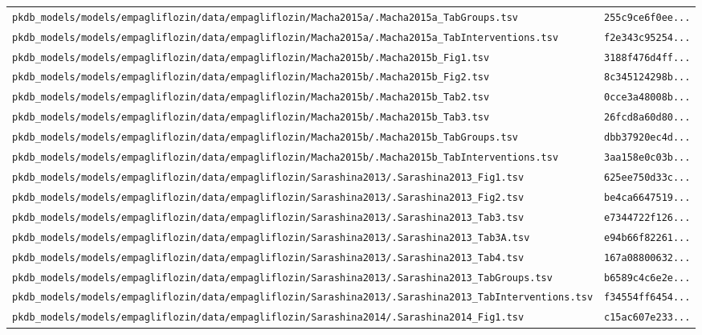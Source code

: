 \begin{longtable}{ll}
\texttt{pkdb\_models/models/empagliflozin/data/empagliflozin/Macha2015a/.Macha2015a\_TabGroups.tsv} & \texttt{255c9ce6f0ee...} \\
\texttt{pkdb\_models/models/empagliflozin/data/empagliflozin/Macha2015a/.Macha2015a\_TabInterventions.tsv} & \texttt{f2e343c95254...} \\
\texttt{pkdb\_models/models/empagliflozin/data/empagliflozin/Macha2015b/.Macha2015b\_Fig1.tsv} & \texttt{3188f476d4ff...} \\
\texttt{pkdb\_models/models/empagliflozin/data/empagliflozin/Macha2015b/.Macha2015b\_Fig2.tsv} & \texttt{8c345124298b...} \\
\texttt{pkdb\_models/models/empagliflozin/data/empagliflozin/Macha2015b/.Macha2015b\_Tab2.tsv} & \texttt{0cce3a48008b...} \\
\texttt{pkdb\_models/models/empagliflozin/data/empagliflozin/Macha2015b/.Macha2015b\_Tab3.tsv} & \texttt{26fcd8a60d80...} \\
\texttt{pkdb\_models/models/empagliflozin/data/empagliflozin/Macha2015b/.Macha2015b\_TabGroups.tsv} & \texttt{dbb37920ec4d...} \\
\texttt{pkdb\_models/models/empagliflozin/data/empagliflozin/Macha2015b/.Macha2015b\_TabInterventions.tsv} & \texttt{3aa158e0c03b...} \\
\texttt{pkdb\_models/models/empagliflozin/data/empagliflozin/Sarashina2013/.Sarashina2013\_Fig1.tsv} & \texttt{625ee750d33c...} \\
\texttt{pkdb\_models/models/empagliflozin/data/empagliflozin/Sarashina2013/.Sarashina2013\_Fig2.tsv} & \texttt{be4ca6647519...} \\
\texttt{pkdb\_models/models/empagliflozin/data/empagliflozin/Sarashina2013/.Sarashina2013\_Tab3.tsv} & \texttt{e7344722f126...} \\
\texttt{pkdb\_models/models/empagliflozin/data/empagliflozin/Sarashina2013/.Sarashina2013\_Tab3A.tsv} & \texttt{e94b66f82261...} \\
\texttt{pkdb\_models/models/empagliflozin/data/empagliflozin/Sarashina2013/.Sarashina2013\_Tab4.tsv} & \texttt{167a08800632...} \\
\texttt{pkdb\_models/models/empagliflozin/data/empagliflozin/Sarashina2013/.Sarashina2013\_TabGroups.tsv} & \texttt{b6589c4c6e2e...} \\
\texttt{pkdb\_models/models/empagliflozin/data/empagliflozin/Sarashina2013/.Sarashina2013\_TabInterventions.tsv} & \texttt{f34554ff6454...} \\
\texttt{pkdb\_models/models/empagliflozin/data/empagliflozin/Sarashina2014/.Sarashina2014\_Fig1.tsv} & \texttt{c15ac607e233...} \\

\end{longtable}
